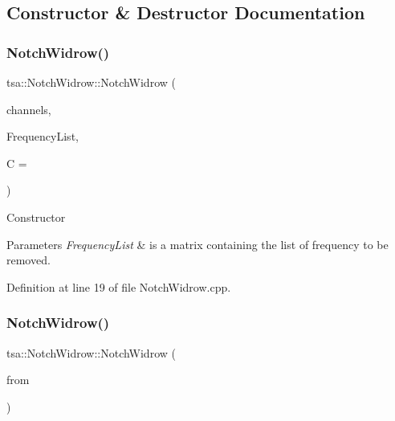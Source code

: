 \subsection{Constructor \& Destructor Documentation}
\mbox{\label{classtsa_1_1_notch_widrow_a7e25ed1b1078586eeba5042708604f3c}} 
\subsubsection{\texorpdfstring{Notch\+Widrow()}{NotchWidrow()}\hspace{0.1cm}{\footnotesize\ttfamily [1/2]}}
{\footnotesize\ttfamily tsa\+::\+Notch\+Widrow\+::\+Notch\+Widrow (\begin{DoxyParamCaption}\item[{unsigned int}]{channels,  }\item[{\hyperlink{namespacetsa_ad260cd21c1891c4ed391fe788569aba4}{Dmatrix} \&}]{Frequency\+List,  }\item[{double}]{C = {} }\end{DoxyParamCaption})}

Constructor 
\begin{DoxyParams}{Parameters}
{\em Frequency\+List} & is a matrix containing the list of frequency to be removed. \\
\hline
\end{DoxyParams}


Definition at line 19 of file Notch\+Widrow.\+cpp.

\mbox{\label{classtsa_1_1_notch_widrow_a035983c44683b3cebc0cc658625766f8}} 
\subsubsection{\texorpdfstring{Notch\+Widrow()}{NotchWidrow()}\hspace{0.1cm}{\footnotesize\ttfamily [2/2]}}
{\footnotesize\ttfamily tsa\+::\+Notch\+Widrow\+::\+Notch\+Widrow (\begin{DoxyParamCaption}\item[{const \hyperlink{classtsa_1_1_notch_widrow}{Notch\+Widrow} \&}]{from }\end{DoxyParamCaption})}

